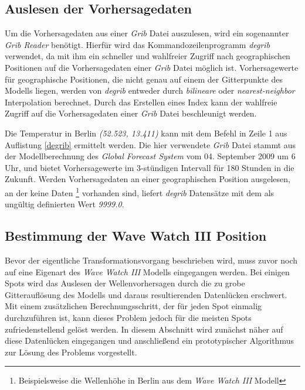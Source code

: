 \subsection{Auslesen der Vorhersagedaten}
\label{auslesen-der-vorhersagedaten}
Um die Vorhersagedaten aus einer \textit{Grib} Datei auszulesen, wird
ein sogenannter \textit{Grib Reader} benötigt. Hierfür wird das
Kommandozeilenprogramm \textit{degrib} verwendet, da mit ihm ein
schneller und wahlfreier Zugriff nach geographischen Positionen auf
die Vorhersagedaten einer \textit{Grib} Datei möglich
ist. Vorhersagewerte für geographische Positionen, die nicht genau auf
einem der Gitterpunkte des Modells liegen, werden von \textit{degrib}
entweder durch \textit{bilineare} oder \textit{nearest-neighbor}
Interpolation berechnet. Durch das Erstellen eines Index kann der
wahlfreie Zugriff auf die Vorhersagedaten einer \textit{Grib} Datei
beschleunigt werden.



Die Temperatur in Berlin \textit{(52.523, 13.411)} kann mit dem Befehl
in Zeile 1 aus Auflistung \ref{degrib} ermittelt werden. Die hier
verwendete \textit{Grib} Datei stammt aus der Modellberechnung des
\textit{Global Forecast System} vom 04. September 2009 um 6 Uhr, und
bietet Vorhersagewerte im 3-stündigen Intervall für 180 Stunden in die
Zukunft. Werden Vorhersagedaten an einer geographischen Position
ausgelesen, an der keine Daten \footnote{Beispielsweise die Wellenhöhe
  in Berlin aus dem \textit{Wave Watch III} Modell} vorhanden sind,
liefert \textit{degrib} Datensätze mit dem als ungültig definierten
Wert \textit{9999.0}. 

\subsection{Bestimmung der Wave Watch III Position}
Bevor der eigentliche Transformationsvorgang beschrieben wird, muss
zuvor noch auf eine Eigenart des \textit{Wave Watch III} Modells
eingegangen werden. Bei einigen Spots wird das Auslesen der
Wellenvorhersagen durch die zu grobe Gitterauflösung des Modells und
daraus resultierenden Datenlücken erschwert. Mit einem zusätzlichen
Berechnungsschritt, der für jeden Spot einmalig durchzuführen ist,
kann dieses Problem jedoch für die meisten Spots zufriedenstellend
gelöst werden. In diesem Abschnitt wird zunächst näher auf diese
Datenlücken eingegangen und anschließend ein prototypischer
Algorithmus zur Lösung des Problems vorgestellt.

